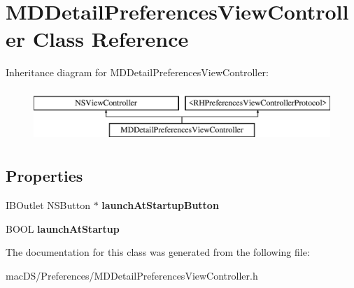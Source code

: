 \hypertarget{interface_m_d_detail_preferences_view_controller}{\section{M\-D\-Detail\-Preferences\-View\-Controller Class Reference}
\label{interface_m_d_detail_preferences_view_controller}
}
Inheritance diagram for M\-D\-Detail\-Preferences\-View\-Controller\-:\begin{figure}[H]
\begin{center}
\leavevmode
\includegraphics[height=2.000000cm]{interface_m_d_detail_preferences_view_controller}
\end{center}
\end{figure}
\subsection*{Properties}
\begin{DoxyCompactItemize}
\item 
\hypertarget{interface_m_d_detail_preferences_view_controller_a1e1d2f0a61e7275f126f549b807e5e8b}{I\-B\-Outlet N\-S\-Button $\ast$ {\bfseries launch\-At\-Startup\-Button}}\label{interface_m_d_detail_preferences_view_controller_a1e1d2f0a61e7275f126f549b807e5e8b}

\item 
\hypertarget{interface_m_d_detail_preferences_view_controller_aeae32b19a1a02e330a74221fa285a883}{B\-O\-O\-L {\bfseries launch\-At\-Startup}}\label{interface_m_d_detail_preferences_view_controller_aeae32b19a1a02e330a74221fa285a883}

\end{DoxyCompactItemize}


The documentation for this class was generated from the following file\-:\begin{DoxyCompactItemize}
\item 
mac\-D\-S/\-Preferences/M\-D\-Detail\-Preferences\-View\-Controller.\-h\end{DoxyCompactItemize}
